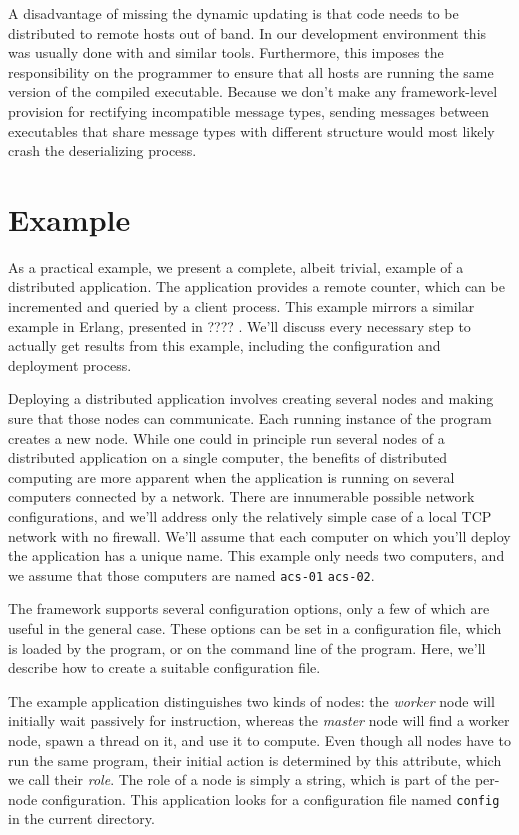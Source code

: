 \documentclass[preprint]{sigplanconf}
\newcommand\je[1]{\nb{jeff}{#1}}
\begin{document}
A disadvantage of missing the dynamic updating is that code needs to be distributed to remote hosts out of band. In our development environment this was usually done with  and similar tools. Furthermore, this imposes the responsibility on the programmer to ensure that all hosts are running the same version of the compiled executable. Because we don't make any framework-level provision for rectifying incompatible message types, sending messages between executables that share message types with different structure would most likely crash the deserializing process.

\section{Example}
As a practical example, we present a complete, albeit trivial, example of a distributed application. The application provides a remote counter, which can be incremented and queried by a client process. This example mirrors a similar example in Erlang, presented in ???? \je{what was the name of that book?}. We'll discuss every necessary step to actually get results from this example, including the configuration and deployment process.

Deploying a distributed application involves creating several nodes and making sure that those nodes can communicate. Each running instance of the program creates a new node. While one could in principle run several nodes of a distributed application on a single computer, the benefits of distributed computing are more apparent when the application is running on several computers connected by a network. There are innumerable possible network configurations, and we'll address only the relatively simple case of a local TCP network with no firewall. We'll assume that each computer on which you'll deploy the application has a unique name. This example only needs two computers, and we assume that those computers are named \texttt{acs-01} \texttt{acs-02}.

The framework supports several configuration options, only a few of which are useful in the general case. These options can be set in a configuration file, which is loaded by the program, or on the command line of the program. Here, we'll describe how to create a suitable configuration file.

The example application distinguishes two kinds of nodes: the {\em worker} node will initially wait passively for instruction, whereas the {\em master} node will find a worker node, spawn a thread on it, and use it to compute. Even though all nodes have to run the same program, their initial action is determined by this attribute, which we call their {\em role}. The role of a node is simply a string, which is part of the per-node configuration. This application looks for a configuration file named \texttt{config} in the current directory.
\end{document}
